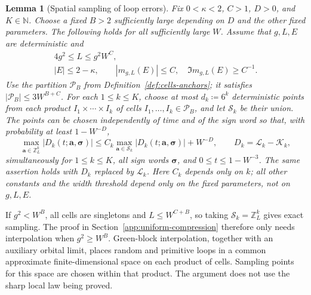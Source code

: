 \documentclass[11pt]{article}
\numberwithin{equation}{section}
\newtheorem{lemma}[theorem]{Lemma}
\theoremstyle{remark}
\newcommand{\Z}{\mathbb Z}
\newcommand{\cL}{\mathcal L}
\newcommand{\cK}{\mathcal K}
\begin{document}
\begin{lemma}[Spatial sampling of loop errors]
\label{uvc:thm:ordinary-sampling}
Fix $0<\kappa<2$, $C>1$, $D>0$, and $K\in\mathbb N$.
Choose a fixed $B>2$ sufficiently large depending on $D$ and the other
fixed parameters. The following holds for all sufficiently large $W$.
Assume that $g,L,E$ are deterministic and
\[
 \begin{gathered}
 4g^2\le L\le g^2W^C,\\
 |E|\le2-\kappa,\qquad
 |m_{g,L}(E)|\le C,\quad \Im m_{g,L}(E)\ge C^{-1}.
 \end{gathered}
\]
Use the partition $\mathcal P_B$ from Definition~\ref{def:cells-anchors};
it satisfies $|\mathcal P_B|\le3W^{B+C}$.
For each $1\le k\le K$, choose
at most $d_k\coloneqq6^k$ deterministic points from each product $I_1\times\cdots\times I_k$
of cells $I_1,\ldots,I_k\in\mathcal P_B$,
and let $\mathcal S_k$ be their union.
The points can be chosen independently of time and of the sign word
so that, with probability at least $1-W^{-D}$,
\begin{equation}\label{fo:eq:spatial-sampling}
 \max_{\boldsymbol a\in\Z_L^k}
       |D_k(t;\boldsymbol a,\boldsymbol\sigma)|
 \le C_k\max_{\boldsymbol a\in\mathcal S_k}
       |D_k(t;\boldsymbol a,\boldsymbol\sigma)|+W^{-D},
 \qquad D_k=\cL_k-\cK_k,
\end{equation}
simultaneously for $1\le k\le K$, all sign words $\boldsymbol\sigma$,
and $0\le t\le1-W^{-3}$. The same assertion holds with $D_k$ replaced
by $\cL_k$. Here $C_k$ depends only on $k$; all other constants and the
width threshold depend only on the fixed parameters, not on $g,L,E$.
\end{lemma}

If $g^2<W^B$, all cells are singletons and $L\le W^{C+B}$, so taking
$\mathcal S_k=\Z_L^k$ gives exact sampling. The proof in
Section~\ref{app:uniform-compression} therefore only needs interpolation
when $g^2\ge W^B$. Green-block interpolation, together with an auxiliary
orbital limit, places random and primitive loops in a common approximate
finite-dimensional space on each product of cells. Sampling points for
this space are chosen within that product. The argument does not use
the sharp local law being proved.
\end{document}
